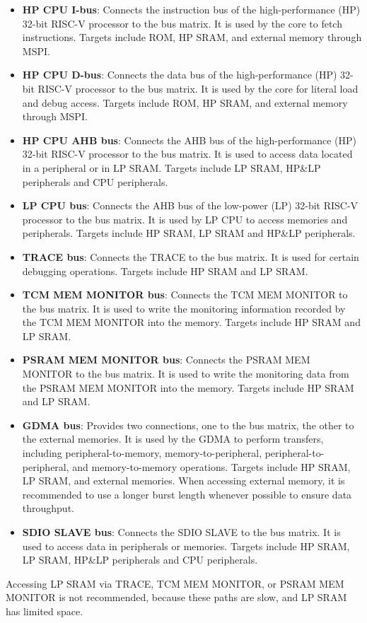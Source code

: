 \documentclass[main\_\_EN.tex]{subfiles}
\begin{document}
\begin{itemize}
    \item \textbf{HP CPU I-bus}: Connects the instruction bus of the high-performance (HP) 32-bit RISC-V processor to the bus matrix. It is used by the core to fetch instructions. Targets include ROM, HP SRAM, and external memory through MSPI.
    \item \textbf{HP CPU D-bus}: Connects the data bus of the high-performance (HP) 32-bit RISC-V processor to the bus matrix. It is used by the core for literal load and debug access. Targets include ROM, HP SRAM, and external memory through MSPI.
    \item \textbf{HP CPU AHB bus}: Connects the AHB bus of the high-performance (HP) 32-bit RISC-V processor to the bus matrix. It is used to access data located in a peripheral or in LP SRAM. Targets include LP SRAM, HP\&LP peripherals and CPU peripherals. 
    \item \textbf{LP CPU bus}: Connects the AHB bus of the low-power (LP) 32-bit RISC-V processor to the bus matrix. It is used by LP CPU to access memories and peripherals. Targets include HP SRAM, LP SRAM and HP\&LP peripherals. 
    \item \textbf{TRACE bus}: Connects the TRACE to the bus matrix. It is used for certain debugging operations. Targets include HP SRAM and LP SRAM.
    \item \textbf{TCM MEM MONITOR bus}: Connects the TCM MEM MONITOR to the bus matrix. It is used to write the monitoring information recorded by the TCM MEM MONITOR into the memory. Targets include HP SRAM and LP SRAM.
    \item \textbf{PSRAM MEM MONITOR bus}: Connects the PSRAM MEM MONITOR to the bus matrix. It is used to write the monitoring data from the PSRAM MEM MONITOR into the memory. Targets include HP SRAM and LP SRAM.
    \item \textbf{GDMA bus}: Provides two connections, one to the bus matrix, the other to the external memories. It is used by the GDMA to perform transfers, including peripheral-to-memory, memory-to-peripheral, peripheral-to-peripheral, and memory-to-memory operations. Targets include HP SRAM, LP SRAM, and external memories. When accessing external memory, it is recommended to use a longer burst length whenever possible to ensure data throughput.
    \item \textbf{SDIO SLAVE bus}: Connects the SDIO SLAVE to the bus matrix. It is used to access data in peripherals or memories. Targets include HP SRAM, LP SRAM, HP\&LP peripherals and CPU peripherals. 
\end{itemize}

\begin{tiplisting}
Accessing LP SRAM via TRACE, TCM MEM MONITOR, or PSRAM MEM MONITOR is not recommended, because these paths are slow, and LP SRAM has limited space.
\end{tiplisting}
\end{document}
